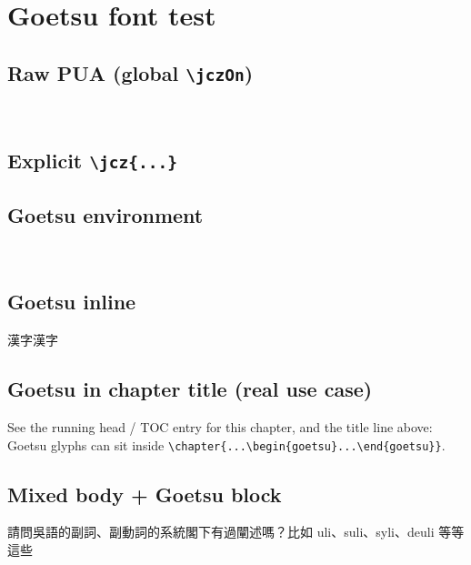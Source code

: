\chapter[Goetsu font test]{Goetsu font test}


\section*{Raw PUA (global \texttt{\textbackslash jczOn})}



\section*{Explicit \texttt{\textbackslash jcz\{...\}}}


\section*{Goetsu environment}

\begin{goetsu}

\end{goetsu}

\section*{Goetsu inline}

漢字漢字

\section*{Goetsu in chapter title (real use case)}

See the running head / TOC entry for this chapter, and the title line above:
Goetsu glyphs can sit inside \verb|\chapter{...\begin{goetsu}...\end{goetsu}}|.

\section*{Mixed body + Goetsu block}

請問吳語的副詞、副動詞的系統閣下有過闡述嗎？比如 uli、suli、syli、deuli 等等這些
\begin{goetsu}

\end{goetsu}

